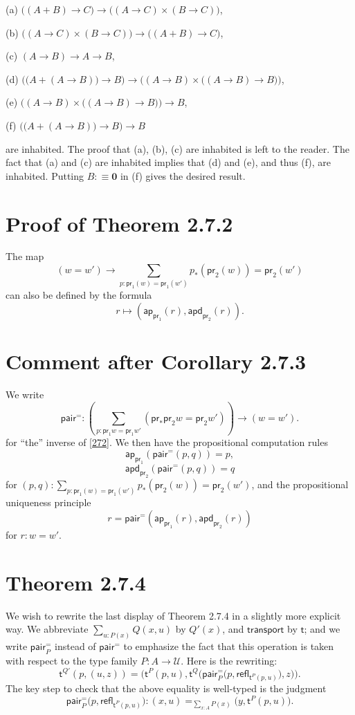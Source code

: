 \documentclass[12pt]{article}
\newcommand{\mbf}{\mathbf}
\newcommand{\msf}{\mathsf}
\newcommand{\ap}{\mathsf{ap}}
\newcommand{\apd}{\mathsf{apd}}
\newcommand{\nn}{\noindent}
\newcommand{\pa}{\mathsf{pair}^=}
\newcommand{\pr}{\mathsf{pr}}
\newcommand{\refl}{\mathsf{refl}}
\newcommand{\tr}{\mathsf{transport}}
\newcommand{\U}{\mathcal U}
\begin{document}
(a) $\big((A+B)\to C\big)\to\big((A\to C)\times(B\to C)\big)$,

(b) $\big((A\to C)\times(B\to C)\big)\to\big((A+B)\to C\big)$,

(c) $(A\to B)\to A\to B$,

(d) $\Big(\big(A+(A\to B)\big)\to B\Big)\to\Big((A\to B)\times\big((A\to B)\to B\big)\Big)$, 

(e) $\Big((A\to B)\times\big((A\to B)\to B\big)\Big)\to B$,

(f) $\Big(\big(A+(A\to B)\big)\to B\Big)\to B$

\nn are inhabited. The proof that (a), (b), (c) are inhabited is left to the reader. The fact that (a) and (c) are inhabited implies that (d) and (e), and thus (f), are inhabited. Putting $B:\equiv\mbf0$ in (f) gives the desired result.


\section{Proof of Theorem 2.7.2}

The map 
\begin{equation}\label{272}
(w=w')\to\sum_{p:\pr_1(w)=\pr_1(w')}p_*(\pr_2(w))=\pr_2(w')
\end{equation}
can also be defined by the formula 
$$
r\mapsto(\ap_{\pr_1}(r),\apd_{\pr_2}(r)).
$$


\section{Comment after Corollary 2.7.3}

We write 
$$
\pa:\left(\sum_{p:\pr_1w=\pr_1w'}(\pr_*\pr_2w=\pr_2w')\right)\to(w=w').
$$ 
for ``the'' inverse of \eqref{272}. We then have the propositional computation rules 
$$
\ap_{\pr_1}(\pa(p,q))=p,
$$
$$
\apd_{\pr_2}(\pa(p,q))=q
$$
for $(p,q):\sum_{p:\pr_1(w)=\pr_1(w')}p_*(\pr_2(w))=\pr_2(w')$, and the propositional uniqueness principle 
$$
r=\pa(\ap_{\pr_1}(r),\apd_{\pr_2}(r))
$$ 
for $r:w=w'$.


\section{Theorem 2.7.4}

We wish to rewrite the last display of Theorem 2.7.4 in a slightly more explicit way. We abbreviate $\sum_{u:P(x)}Q(x,u)$ by $Q'(x)$, and $\tr$ by $\msf t$; and we write $\pa_P$ instead of $\pa$ to emphasize the fact that this operation is taken with respect to the type family $P:A\to\U$. Here is the rewriting:
$$
\msf t^{Q'}(p,(u,z))=\Bigg(\msf t^P(p,u),\msf t^Q\bigg(\pa_P\Big(p,\refl_{\msf t^P(p,u)}\Big),z\bigg)\Bigg).
$$ 
The key step to check that the above equality is well-typed is the judgment  
$$
\pa_P\Big(p,\refl_{\msf t^P(p,u)}\Big):(x,u)=_{\sum_{x:A}P(x)}\big(y,\msf t^P(p,u)\big).
$$
\end{document}
